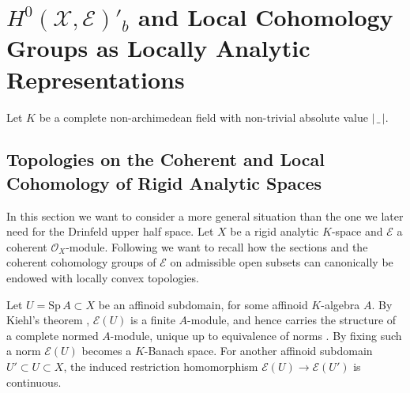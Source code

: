 \documentclass[a4paper, reqno, 10pt]{amsart}
\theoremstyle{definition}
\numberwithin{equation}{section}
\newcommand{\abs}[1]{{\lvert{#1}\rvert}}
\newcommand{\blank}{{\,\_\,}}
\newcommand{\ra}{\rightarrow}
\newcommand{\Sp}{{\mathrm{Sp}}}
\newcommand{\CE}{{\mathcal {E}}}
\newcommand{\CO}{{\mathcal {O}}}
\newcommand{\CX}{{\mathcal {X}}}
\begin{document}
\vspace{3ex}



\newcommand{\sd}{{r}}
\newcommand{\rigbun}{{}}
\newcommand{\algbun}{{\mathrm{alg}}}
\newcommand{\boundedregion}{{\Delta}}



\section{$H^0(\CX,\CE)'_b$ and Local Cohomology Groups as Locally Analytic Representations}









Let $K$ be a complete non-archimedean field with non-trivial absolute value $\abs{\blank}$.




\subsection{Topologies on the Coherent and Local Cohomology of Rigid Analytic Spaces}\label{Sect 2 - Topologies on the Coherent Cohomology of Rigid Analytic Spaces}



In this section we want to consider a more general situation than the one we later need for the Drinfeld upper half space.
Let $X$ be a rigid analytic $K$-space and $\CE$ a coherent $\CO_X$-module.
Following \cite[1.6]{vanderPut92SerreDualRigidAnSp} we want to recall how the sections and the coherent cohomology groups of $\CE$ on admissible open subsets can canonically be endowed with locally convex topologies.

Let $U = \Sp\, A \subset X$ be an affinoid subdomain, for some affinoid $K$-algebra $A$.
By Kiehl's theorem \cite[9.4.3 Thm.\ 3]{BoschGuentzerRemmert84NonArchAna}, $\CE(U)$ is a finite $A$-module, and hence carries the structure of a complete normed $A$-module, unique up to equivalence of norms \cite[3.7.3 Prop.\ 3]{BoschGuentzerRemmert84NonArchAna}.
By fixing such a norm $\CE(U)$ becomes a $K$-Banach space.
For another affinoid subdomain $U'\subset U \subset X$, the induced restriction homomorphism $\CE(U)\ra \CE(U')$ is continuous.
\end{document}
